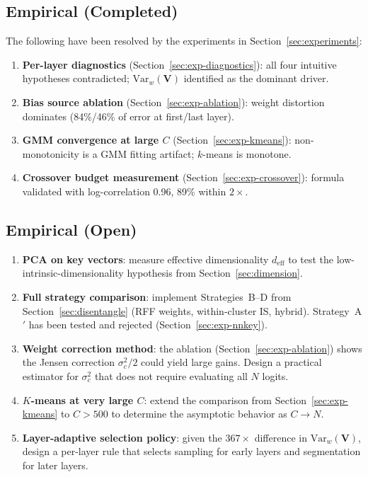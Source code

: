 \documentclass[11pt,a4paper]{article}
\theoremstyle{definition}
\newcommand{\Var}{\mathrm{Var}}
\begin{document}
\subsection{Empirical (Completed)}
The following have been resolved by the experiments in
Section~\ref{sec:experiments}:
\begin{enumerate}[nosep]
  \item[\checkmark] \textbf{Per-layer diagnostics}
    (Section~\ref{sec:exp-diagnostics}): all four intuitive hypotheses
    contradicted; $\Var_w(\mathbf{V})$ identified as the dominant driver.
  \item[\checkmark] \textbf{Bias source ablation}
    (Section~\ref{sec:exp-ablation}): weight distortion dominates (84\%/46\%
    of error at first/last layer).
  \item[\checkmark] \textbf{GMM convergence at large $C$}
    (Section~\ref{sec:exp-kmeans}): non-monotonicity is a GMM fitting
    artifact; $k$-means is monotone.
  \item[\checkmark] \textbf{Crossover budget measurement}
    (Section~\ref{sec:exp-crossover}): formula validated with log-correlation
    0.96, 89\% within $2\times$.
\end{enumerate}

\subsection{Empirical (Open)}
\begin{enumerate}[nosep]
  \item \textbf{PCA on key vectors}: measure effective dimensionality
    $d_{\mathrm{eff}}$ to test the low-intrinsic-dimensionality hypothesis
    from Section~\ref{sec:dimension}.
  \item \textbf{Full strategy comparison}: implement Strategies~B--D from
    Section~\ref{sec:disentangle} (RFF weights, within-cluster IS, hybrid).
    Strategy~A$'$ has been tested and rejected
    (Section~\ref{sec:exp-nnkey}).
  \item \textbf{Weight correction method}: the ablation
    (Section~\ref{sec:exp-ablation}) shows the Jensen correction
    $\sigma_c^2/2$ could yield large gains.  Design a practical estimator
    for $\sigma_c^2$ that does not require evaluating all $N$ logits.
  \item \textbf{$K$-means at very large $C$}: extend the comparison from
    Section~\ref{sec:exp-kmeans} to $C > 500$ to determine the asymptotic
    behavior as $C \to N$.
  \item \textbf{Layer-adaptive selection policy}: given the $367\times$
    difference in $\Var_w(\mathbf{V})$, design a per-layer rule that selects
    sampling for early layers and segmentation for later layers.
\end{enumerate}
\end{document}
